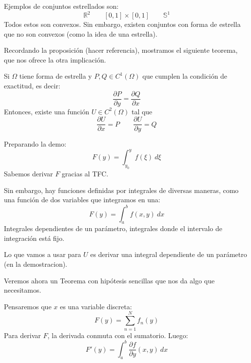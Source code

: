 Ejemplos de conjuntos estrellados son:
\begin{equation*}
    \mathbb{R}^2 \qquad [0,1]\times [0,1] \qquad \mathbb{S}^1
\end{equation*}
Todos estos son convexos. Sin embargo, existen conjuntos con forma de estrella que no son convexos (como la idea de una estrella). %

Recordando la proposición (hacer referencia), mostramos el siguiente teorema, que nos ofrece la otra implicación.
\begin{teo}
    Si $\Omega$ tiene forma de estrella y $P,Q\in C^1(\Omega)$ que cumplen la condición de exactitud, es decir:
    \begin{equation*}
        \dfrac{\partial P}{\partial y} = \dfrac{\partial Q}{\partial x}
    \end{equation*}
    Entonces, existe una función $U\in C^2(\Omega)$ tal que 
    \begin{equation*}
        \dfrac{\partial U}{\partial x} = P \qquad \dfrac{\partial U}{\partial y} = Q
    \end{equation*}
\end{teo}

Preparando la demo:
\begin{equation*}
    F(y) = \int_{y_0}^{y} f(\xi)~d\xi 
\end{equation*}
Sabemos derivar $F$ gracias al TFC\@.

Sin embargo, hay funciones definidas por integrales de diversas maneras, como una función de dos variables que integramos en una:
\begin{equation*}
    F(y) = \int_{a}^{b} f(x,y)~dx 
\end{equation*}
Integrales dependientes de un parámetro, integrales donde el intervalo de integración está fijo.

Lo que vamos a usar para $U$ es derivar una integral dependiente de un parámetro (en la demostracion).

Veremos ahora un Teorema con hipótesis sencillas que nos da algo que necesitamos.


Pensaremos que $x$ es una variable discreta:
\begin{equation*}
    F(y) = \sum_{n=1}^{N} f_n(y)
\end{equation*}
Para derivar $F$, la derivada conmuta con el sumatorio. Luego:
\begin{equation*}
    F'(y) = \int_{a}^{b} \dfrac{\partial f}{\partial y}(x,y)~dx 
\end{equation*}

